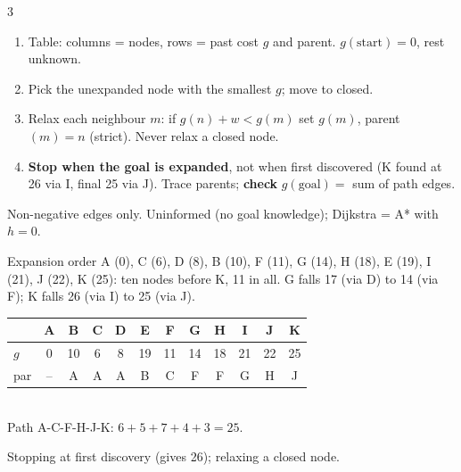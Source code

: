 \begin{multicols}{3}
\begin{recipe}
\begin{enumerate}
\item Table: columns = nodes, rows = past cost $g$ and parent. $g(\text{start})=0$, rest unknown.
\item Pick the unexpanded node with the smallest $g$; move to closed.
\item Relax each neighbour $m$: if $g(n)+w<g(m)$ set $g(m)$, parent$(m)=n$ (strict). Never relax a closed node.
\item \textbf{Stop when the goal is expanded}, not when first discovered (K found at 26 via I, final 25 via J). Trace parents; \textbf{check} $g(\text{goal})=$ sum of path edges.
\end{enumerate}
\end{recipe}
Non-negative edges only. Uninformed (no goal knowledge); Dijkstra = A* with $h=0$.
\begin{worked}
Expansion order A (0), C (6), D (8), B (10), F (11), G (14), H (18), E (19), I (21), J (22), K (25): ten nodes before K, 11 in all. G falls 17 (via D) to 14 (via F); K falls 26 (via I) to 25 (via J).\\[1pt]
\begin{tabularx}{\linewidth}{@{}l*{11}{c}@{}}\toprule
 & A&B&C&D&E&F&G&H&I&J&K\\\midrule
$g$ &0&10&6&8&19&11&14&18&21&22&25\\
par &--&A&A&A&B&C&F&F&G&H&J\\\bottomrule
\end{tabularx}\\
Path A-C-F-H-J-K: $6+5+7+4+3=25$. \chk
\end{worked}
\begin{trap}
Stopping at first discovery (gives 26); relaxing a closed node.
\end{trap}


\end{multicols}
